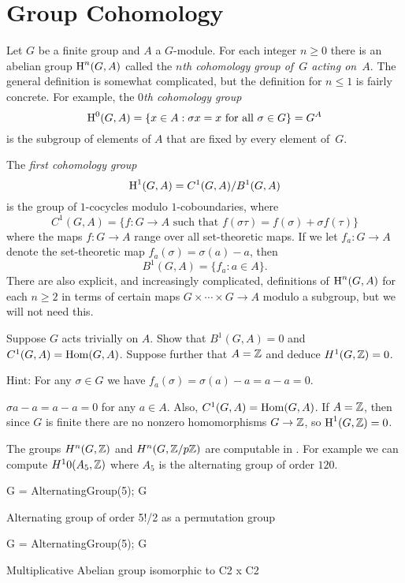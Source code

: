\section{Group Cohomology}

Let $G$ be a finite group and $A$ a $G$-module.
For each integer $n\geq 0$ there is an abelian group $\operatorname{H}^n(G,A)$
called the {\em $n$th cohomology group of~$G$ acting on~$A$}.  The
general definition is somewhat complicated, but the definition for
$n\leq 1$ is fairly concrete.
For example, the {\em $0$th cohomology group}
$$
	\operatorname{H}^0(G,A) = \{x \in A : \sigma x = x \text{ for all } \sigma \in G\} = G^A
$$
is the subgroup of elements of $A$ that are fixed by every element
of~$G$.

The {\em first cohomology group}
$$
	\operatorname{H}^1(G,A) = C^1(G,A)/B^1(G,A)
$$
is the group of $1$-cocycles modulo $1$-coboundaries, where
$$
	C^1(G, A) = \{f : G \to A \text{ such that } f(\sigma\tau)
	= f(\sigma) + \sigma f(\tau)\}
$$
where the maps $f:G\to A$ range over all set-theoretic maps.
If we let $f_a: G \to A$ denote the set-theoretic map $f_a(\sigma) = \sigma(a)-a$,
then
$$
	B^1(G, A) = \{f_a :  a\in A\}.
$$
There are also explicit, and increasingly complicated, definitions of
$\operatorname{H}^n(G,A)$ for each $n\geq 2$ in terms of certain maps $G \times
\cdots \times G \to A$ modulo a subgroup, but we will not need this.

\begin{exercise}
	Suppose $G$ acts trivially on $A$. Show that $B^1(G,A)=0$
	and $C^1(G,A) = \operatorname{Hom}(G,A)$.
	Suppose further that $A = \mathbb{Z}$ and deduce $H^1(G,\mathbb{Z}) = 0$.
	
	Hint: For any $\sigma\in G$ we have
	$f_a(\sigma) = \sigma(a) - a = a - a = 0$.
		
	$\sigma a - a = a -a =0$ for any $a\in A$.  Also, $C^1(G,A) =
	\operatorname{Hom}(G,A)$.  If $A=\mathbb{Z}$, then since $G$ is finite there are no nonzero
	homomorphisms $G\to \mathbb{Z}$, so $\operatorname{H}^1(G,\mathbb{Z})=0$.
\end{exercise}

\begin{example}
	The groups $H^n(G,\mathbb{Z})$ and $H^n(G,\mathbb{Z}/p\mathbb{Z})$ are computable
	in \sage. For example we can compute $H^10(A_5,\mathbb{Z})$
	where $A_5$ is the alternating group of order $120$.
\begin{sagecode}
\begin{sagecell}
G = AlternatingGroup(5); G
\end{sagecell}
\begin{sageout}
Alternating group of order 5!/2 as a permutation group
\end{sageout}
\begin{sagecell}
G = AlternatingGroup(5); G
\end{sagecell}
\begin{sageout}
Multiplicative Abelian group isomorphic to C2 x C2
\end{sageout}
\end{sagecode}
\end{example}

